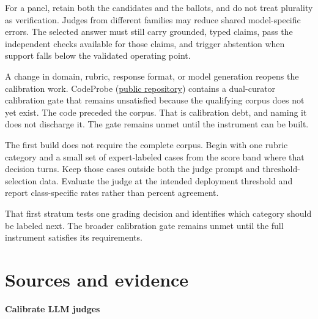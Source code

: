 For a panel, retain both the candidates and the ballots, and do not treat plurality as verification. Judges from different families may reduce shared model-specific errors. The selected answer must still carry grounded, typed claims, pass the independent checks available for those claims, and trigger abstention when support falls below the validated operating point.

A change in domain, rubric, response format, or model generation reopens the calibration work. CodeProbe (\href{https://github.com/sjarmak/codeprobe}{public repository}) contains a dual-curator calibration gate that remains unsatisfied because the qualifying corpus does not yet exist. The code preceded the corpus. That is calibration debt, and naming it does not discharge it. The gate remains unmet until the instrument can be built.

The first build does not require the complete corpus. Begin with one rubric category and a small set of expert-labeled cases from the score band where that decision turns. Keep those cases outside both the judge prompt and threshold-selection data. Evaluate the judge at the intended deployment threshold and report class-specific rates rather than percent agreement.

That first stratum tests one grading decision and identifies which category should be labeled next. The broader calibration gate remains unmet until the full instrument satisfies its requirements.

\section*{Sources and evidence}

\textbf{Calibrate LLM judges}


